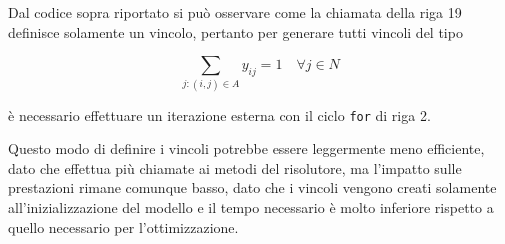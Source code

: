 \noindent Dal codice sopra riportato si può osservare come la chiamata della riga 19 definisce solamente un vincolo, pertanto per generare tutti vincoli del tipo

$$
\sum\limits_{j : (i,j) \in A} y_{ij} = 1 \quad \forall j \in N
$$

\noindent è necessario effettuare un iterazione esterna con il ciclo \texttt{for} di riga 2.

Questo modo di definire i vincoli potrebbe essere leggermente meno efficiente, dato che effettua più chiamate ai metodi del risolutore, ma l'impatto sulle prestazioni rimane comunque basso, dato che i vincoli vengono creati solamente all'inizializzazione del modello e il tempo necessario è molto inferiore rispetto a quello necessario per l'ottimizzazione.